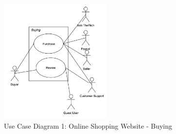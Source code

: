 \documentclass[11pt]{article}
\begin{document}
\begin{figure}[htbp]
    \centering
    \includegraphics[width=0.5\textwidth]{ucd2.png}
    \caption{Use Case Diagram 1: Online Shopping Website - Buying }
    \label{fig:ucd2}
\end{figure}
\end{document}
